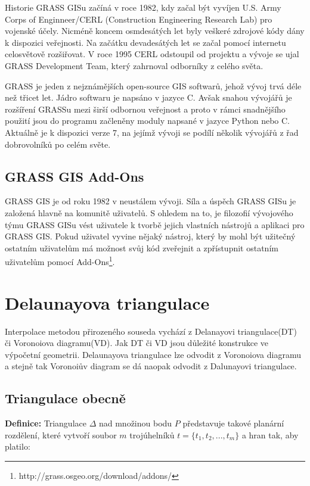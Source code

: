 \documentclass[12pt,a4paper]{article}
\begin{document}
Historie\cite{rukovet} GRASS GISu začíná v roce 1982, kdy začal být vyvíjen U.S. Army Corps of Enginneer/CERL (Construction Engineering Research Lab) pro vojenské účely. Nicméně koncem osmdesátých let byly veškeré zdrojové kódy dány k dispozici veřejnosti. Na začátku devadesátých let se začal pomocí internetu celosvětově rozšiřovat. V roce 1995 CERL odstoupil od projektu a vývoje se ujal GRASS Development Team, který zahrnoval odborníky z celého světa.

GRASS je jeden z nejznámějších open-source GIS softwarů, jehož vývoj trvá déle než třicet let. Jádro softwaru je napsáno v jazyce C. Avšak snahou vývojářů je rozšíření GRASSu mezi širší odbornou veřejnost a proto v rámci snadnějšího použití jsou do programu začleněny moduly napsané v jazyce Python nebo C. Aktuálně je k dispozici verze 7, na jejímž vývoji se podílí několik vývojářů z řad dobrovolníků po celém světe.

\subsection{GRASS GIS Add-Ons}
GRASS GIS je od roku 1982 v neustálem vývoji. Síla a úspěch GRASS GISu je založená hlavně na komunitě uživatelů. S ohledem na to, je filozofií vývojového týmu GRASS GISu vést uživatele k tvorbě jejich vlastních nástrojů a aplikaci pro GRASS GIS. Pokud uživatel vyvine nějaký nástroj, který by mohl být užitečný ostatním uživatelům má možnost svůj kód zveřejnit a zpřístupnit ostatním uživatelům pomocí Add-Ons\footnote{http://grass.osgeo.org/download/addons/}.

\newpage
\section{Delaunayova triangulace}
Interpolace metodou přirozeného souseda vychází z Delanayovi triangulace(DT) či Voronoiova diagramu(VD). Jak DT či VD jsou důležité konstrukce ve výpočetní geometrii. Delaunayova triangulace lze odvodit z Voronoiova diagramu a stejně tak Voronoiův diagram se dá naopak odvodit z Dalunayovi triangulace.

\subsection{Triangulace obecně}
\textbf{Definice\cite{TB1}:}
Triangulace $\Delta$ nad množinou bodu $P$ představuje takové planární rozdělení, které vytvoří soubor $m$ trojúhelníků $t = \{ t_1, t_2,...,t_m \}$ a hran tak, aby platilo:
\end{document}
